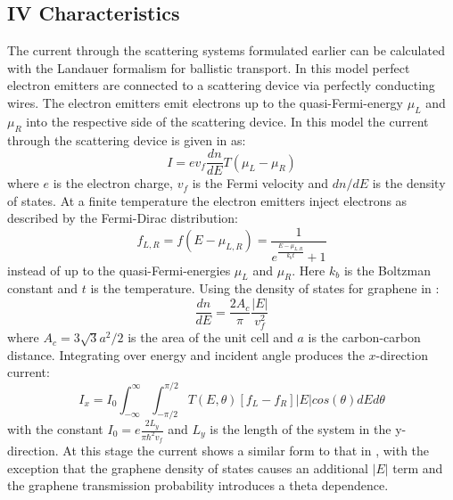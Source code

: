 \documentclass[prl,twocolumn,aps,superscriptaddress,floatfix,10pt]{revtex4}
\begin{document}

\subsection{IV Characteristics}
	The current through the scattering systems formulated earlier can be calculated with the Landauer formalism for ballistic transport. In this model perfect electron emitters are connected to a scattering device via perfectly conducting wires. The electron emitters emit electrons up to the quasi-Fermi-energy $\mu_{L}$ and $\mu_{R}$ into the respective side of the scattering device. In this model the current through the scattering device is given in \cite{b8} as:
\begin{equation}
	I=ev_{f}\frac{dn}{dE}T\left(\mu_{L}-\mu_{R}\right)
	\label{current-dos}
\end{equation}
where $e$ is the electron charge, $v_{f}$ is the Fermi velocity and $dn/dE$ is the density of states. At a finite temperature the electron emitters inject electrons as described by the Fermi-Dirac distribution:
\begin{equation}
	f_{L,R}=f\left(E-\mu_{L,R}\right)=\frac{1}{e^{\frac{E-\mu_{L,R}}{k_{b}t}}+1}
\end{equation}
instead of up to the quasi-Fermi-energies $\mu_{L}$ and $\mu_{R}$. Here $k_{b}$ is the Boltzman constant and $t$ is the temperature. Using the density of states for graphene in \cite{b1}:
\begin{equation}
	\frac{dn}{dE}=\frac{2A_{c}}{\pi}\frac{|E|}{v_{f}^{2}}
	\label{graphene-dos}
\end{equation}
where $A_{c}=3\sqrt{3}a^{2}/2$ is the area of the unit cell and $a$ is the carbon-carbon distance. Integrating over energy and incident angle produces the $x$-direction current:
\begin{equation}
	I_{x}=I_{0}\int^{\infty}_{-\infty}\int^{\pi/2}_{-\pi/2}T\left(E,\theta\right)\left[f_{L}-f_{R}\right]|E|cos\left(\theta\right)dEd\theta
	\label{i}
\end{equation}
with the constant $I_{0}=e\frac{2L_{y}}{\pi\hbar^{2}v_{f}}$ and $L_{y}$ is the length of the system in the y-direction. At this stage the current shows a similar form to that in \cite{b15, b16}, with the exception that the graphene density of states causes an additional $|E|$ term and the graphene transmission probability introduces a theta dependence.
\end{document}

